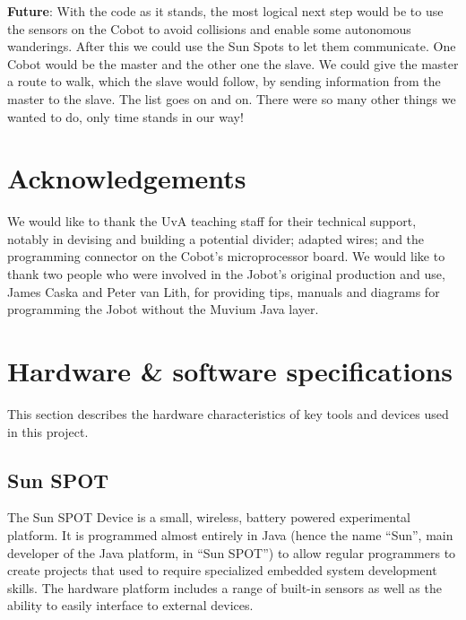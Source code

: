 \documentclass[a4paper,10pt]{article} %
\begin{document}
\noindent \textbf{Future}: With the code as it stands, the most logical next step would be to use the sensors on the Cobot to avoid collisions and enable some autonomous wanderings. After this we could use the Sun Spots to let them
communicate. One Cobot would be the master and the other one the slave. We
could give the master a route to walk, which the slave would follow, by sending information from the master to the slave. The list goes on
and on. There were so many other things we wanted to do, only time stands in our way!


\section{Acknowledgements} %

We would like to thank the UvA teaching staff for their technical support, notably in devising and building a potential divider; adapted wires; and the programming connector on the Cobot's microprocessor board. We would like to thank two people who were involved in the Jobot's original production and use, James Caska and Peter van Lith, for providing tips, manuals and diagrams for programming the Jobot without the Muvium Java layer.


\pagebreak

\appendix

\section{Hardware \& software specifications} %
\label{app:robot-hardware}

This section describes the hardware characteristics of key tools and devices
used in this project.

\subsection{Sun SPOT} %
\label{app:Sun SPOT}

The Sun SPOT Device is a small, wireless, battery powered experimental platform.
It is programmed almost entirely in Java (hence the name ``Sun'', main developer
of the Java platform, in ``Sun SPOT'') to allow regular programmers to create
projects that used to require specialized embedded system development skills.
The hardware platform includes a range of built-in sensors as well as the
ability to easily interface to external devices.
\end{document}
